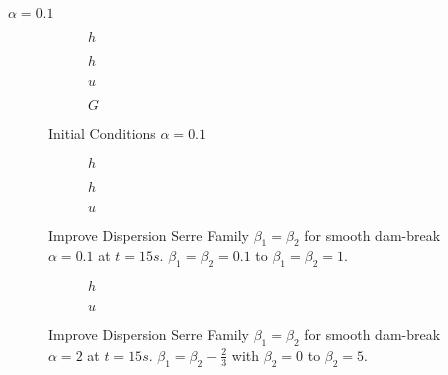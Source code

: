 \documentclass[10pt]{article}
\begin{document}
$\alpha = 0.1$

\begin{figure}
	\centering
	\begin{subfigure}{0.49\textwidth}
		\centering
		
		\caption{$h$}
	\end{subfigure}
	\begin{subfigure}{0.49\textwidth}
		\centering
		
		\caption{$h$}
	\end{subfigure}
	\begin{subfigure}{0.49\textwidth}
		\centering
		
		\caption{$u$}
	\end{subfigure}
	\begin{subfigure}{0.49\textwidth}
		\centering
		
		\caption{$G$}
	\end{subfigure}
	\caption{Initial Conditions $\alpha = 0.1$}
\end{figure}

\begin{figure}
	\centering
	\begin{subfigure}{0.49\textwidth}
		\centering
		
		\caption{$h$}
	\end{subfigure}
	\begin{subfigure}{0.49\textwidth}
		\centering
		
		\caption{$h$}
	\end{subfigure}
	\begin{subfigure}{0.49\textwidth}
		\centering
		
		\caption{$u$}
	\end{subfigure}
	\caption{Improve Dispersion Serre Family $\beta_1 = \beta_2$ for smooth dam-break $\alpha = 0.1$ at $t=15s$. $\beta_1 =\beta_2 = 0.1$ to $\beta_1 =\beta_2 = 1$. }
\end{figure}

\begin{figure}
	\centering
	\begin{subfigure}{0.49\textwidth}
		\centering
		
		\caption{$h$}
	\end{subfigure}
	\begin{subfigure}{0.49\textwidth}
		\centering
		
		\caption{$u$}
	\end{subfigure}
	\caption{Improve Dispersion Serre Family $\beta_1 = \beta_2$ for smooth dam-break $\alpha = 2$ at $t=15s$. $\beta_1 = \beta_2 - \frac{2}{3}$ with  $\beta_2 = 0$ to $\beta_2 = 5$. }
\end{figure}
\end{document}
